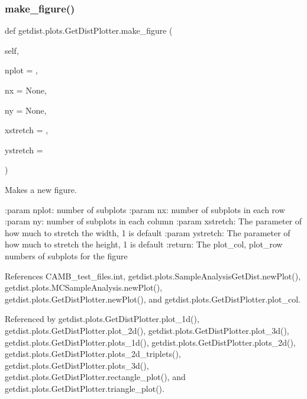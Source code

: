 \subsubsection{\texorpdfstring{make\+\_\+figure()}{make\_figure()}}
{\footnotesize\ttfamily def getdist.\+plots.\+Get\+Dist\+Plotter.\+make\+\_\+figure (\begin{DoxyParamCaption}\item[{}]{self,  }\item[{}]{nplot = {},  }\item[{}]{nx = {\ttfamily None},  }\item[{}]{ny = {\ttfamily None},  }\item[{}]{xstretch = {},  }\item[{}]{ystretch = {} }\end{DoxyParamCaption})}

\begin{DoxyVerb}Makes a new figure.

:param nplot: number of subplots
:param nx: number of subplots in each row
:param ny: number of subplots in each column
:param xstretch: The parameter of how much to stretch the width, 1 is default
:param ystretch: The parameter of how much to stretch the height, 1 is default
:return: The plot_col, plot_row numbers of subplots for the figure
\end{DoxyVerb}
 

References C\+A\+M\+B\+\_\+test\+\_\+files.\+int, getdist.\+plots.\+Sample\+Analysis\+Get\+Dist.\+new\+Plot(), getdist.\+plots.\+M\+C\+Sample\+Analysis.\+new\+Plot(), getdist.\+plots.\+Get\+Dist\+Plotter.\+new\+Plot(), and getdist.\+plots.\+Get\+Dist\+Plotter.\+plot\+\_\+col.



Referenced by getdist.\+plots.\+Get\+Dist\+Plotter.\+plot\+\_\+1d(), getdist.\+plots.\+Get\+Dist\+Plotter.\+plot\+\_\+2d(), getdist.\+plots.\+Get\+Dist\+Plotter.\+plot\+\_\+3d(), getdist.\+plots.\+Get\+Dist\+Plotter.\+plots\+\_\+1d(), getdist.\+plots.\+Get\+Dist\+Plotter.\+plots\+\_\+2d(), getdist.\+plots.\+Get\+Dist\+Plotter.\+plots\+\_\+2d\+\_\+triplets(), getdist.\+plots.\+Get\+Dist\+Plotter.\+plots\+\_\+3d(), getdist.\+plots.\+Get\+Dist\+Plotter.\+rectangle\+\_\+plot(), and getdist.\+plots.\+Get\+Dist\+Plotter.\+triangle\+\_\+plot().


